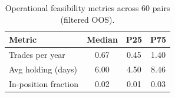 \begin{table}[h]
\centering
\caption{Operational feasibility metrics across 60 pairs (filtered OOS).}
\label{tab:operational_metrics}
\small
\begin{tabular}{lccc}
\hline
\textbf{Metric} & \textbf{Median} & \textbf{P25} & \textbf{P75} \\
\hline
Trades per year & 0.67 & 0.45 & 1.40 \\
Avg holding (days) & 6.00 & 4.50 & 8.46 \\
In-position fraction & 0.02 & 0.01 & 0.03 \\
\hline
\end{tabular}
\end{table}
